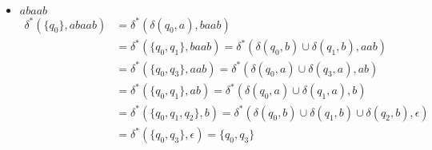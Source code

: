 \documentclass{article}
\begin{document}
\begin{enumerate}
{\begin{itemize}
\begin{enumerate}
{\begin{itemize}
{\begin{align*}
                                    = \delta^{*}(\delta(q_{0}, b) 
                                    \cup \delta(q_{3}, b) 
                                    \cup \delta(q_{4}, b)
                                    \cup \delta(q_{5}, b), \epsilon) \\
                                    &= \delta^{*}(\{q_{0}, q_{3}, q_{4}, q_{5}\}, \epsilon)
                                    = \{q_{0}, q_{3}, q_{4}, q_{5}\}
                                \end{align*}
                                Luego 
                                \[\delta^{*}(\{q_{0}\}, aabbbb) \cap F = 
                                \{q_{0}, q_{3}, q_{4}, q_{5}\} \cap \{q_{5}\}
                                = \{q_{5}\} \neq \varnothing\]
                                Por lo que $aabbbb$ sí es aceptado por el 
                                autómata.
                            }
                            \item {
                                $abaab$
                                \begin{align*}
                                    \delta^{*}(\{q_{0}\}, abaab)
                                    &= \delta^{*}(\delta(q_{0}, a), baab) \\
                                    &= \delta^{*}(\{q_{0}, q_{1}\}, baab) 
                                    = \delta^{*}(\delta(q_{0}, b) 
                                    \cup \delta(q_{1}, b), aab) \\
                                    &= \delta^{*}(\{q_{0}, q_{3}\}, aab) 
                                    = \delta^{*}(\delta(q_{0}, a) 
                                    \cup \delta(q_{3}, a), ab) \\
                                    &= \delta^{*}(\{q_{0}, q_{1}\}, ab) 
                                    = \delta^{*}(\delta(q_{0}, a) 
                                    \cup \delta(q_{1}, a), b) \\
                                    &= \delta^{*}(\{q_{0}, q_{1}, q_{2}\}, b)
                                    = \delta^{*}(\delta(q_{0}, b) 
                                    \cup \delta(q_{1}, b) 
                                    \cup \delta(q_{2}, b), \epsilon) \\
                                    &= \delta^{*}(\{q_{0}, q_{3}\}, \epsilon)
                                    = \{q_{0}, q_{3}\}
                                \end{align*}
}
\end{itemize}}
\end{enumerate}
\end{itemize}}
\end{enumerate}
\end{document}
